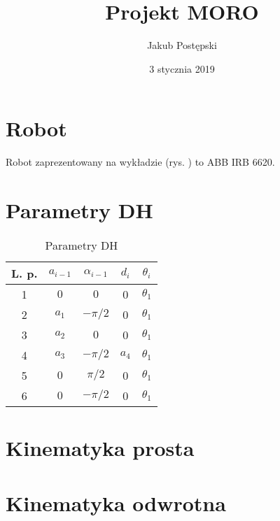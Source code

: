 \documentclass[]{article}
\title{Projekt MORO}
\author{Jakub Postępski}
\date{3 stycznia 2019}
\begin{document}
\maketitle

\section{Robot}

Robot zaprezentowany na wykładzie (rys. ) to ABB IRB 6620.

\section{Parametry DH}

\begin{table}[H]
	\begin{tabular}{|| c | c c c c ||}
		\hline
		L. p. & $a_{i-1}$ & $\alpha_{i-1}$ & $d_i$ & $\theta_i$ \\ 
		\hline\hline
		1 & $ 0 $ & $0$ & 0 & $\theta_1$ \\
		\hline
		2 & $a_1$ & $-\pi/2$ & 0 & $\theta_1$ \\
		\hline
		3 & $a_2$ & $0$ & 0 & $\theta_1$ \\
		\hline
		4 & $a_3$ & $-\pi/2$ & $a_4$ & $\theta_1$ \\
		\hline
		5 & $0$ & $\pi/2$ & 0 & $\theta_1$ \\
		\hline
		6 & $0$ & $-\pi/2$ & 0 & $\theta_1$ \\
		\hline
		
		
		
	\end{tabular}
	\caption{Parametry DH}
	\label{tab1}
\end{table}

\section{Kinematyka prosta}

\section{Kinematyka odwrotna}
\end{document}
